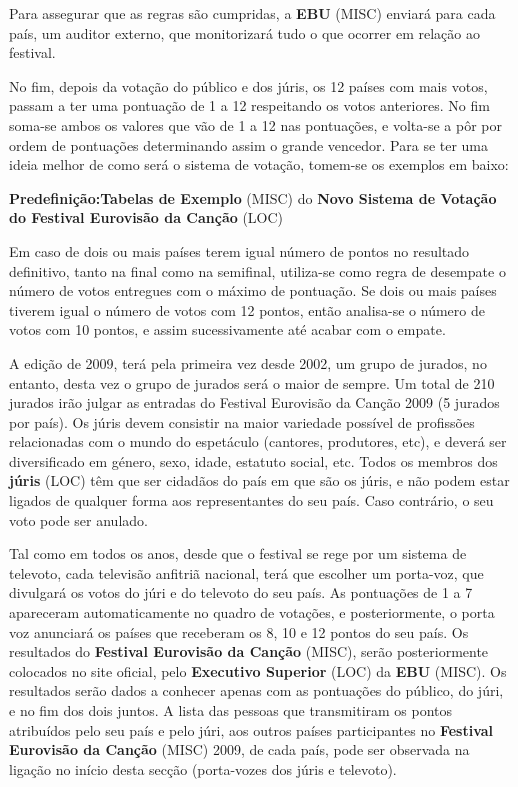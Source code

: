 \documentclass[12pt,a4paper]{article}
\begin{document}
Para assegurar que as regras são cumpridas, a \textbf{EBU} (MISC) enviará para cada país, um auditor externo, que monitorizará tudo o que ocorrer em relação ao festival.

No fim, depois da votação do público e dos júris, os 12 países com mais votos, passam a ter uma pontuação de 1 a 12 respeitando os votos anteriores. No fim soma-se ambos os valores que vão de 1 a 12 nas pontuações, e volta-se a pôr por ordem de pontuações determinando assim o grande vencedor. Para se ter uma ideia melhor de como será o sistema de votação, tomem-se os exemplos em baixo:

\textbf{Predefinição:Tabelas de Exemplo} (MISC) do \textbf{Novo Sistema de Votação do Festival Eurovisão da Canção} (LOC)

Em caso de dois ou mais países terem igual número de pontos no resultado definitivo, tanto na final como na semifinal, utiliza-se como regra de desempate o número de votos entregues com o máximo de pontuação. Se dois ou mais países tiverem igual o número de votos com 12 pontos, então analisa-se o número de votos com 10 pontos, e assim sucessivamente até acabar com o empate.

A edição de 2009, terá pela primeira vez desde 2002, um grupo de jurados, no entanto, desta vez o grupo de jurados será o maior de sempre. Um total de 210 jurados irão julgar as entradas do Festival Eurovisão da Canção 2009 (5 jurados por país). Os júris devem consistir na maior variedade possível de profissões relacionadas com o mundo do espetáculo (cantores, produtores, etc), e deverá ser diversificado em género, sexo, idade, estatuto social, etc. Todos os membros dos \textbf{júris} (LOC) têm que ser cidadãos do país em que são os júris, e não podem estar ligados de qualquer forma aos representantes do seu país. Caso contrário, o seu voto pode ser anulado.

Tal como em todos os anos, desde que o festival se rege por um sistema de televoto, cada televisão anfitriã nacional, terá que escolher um porta-voz, que divulgará os votos do júri e do televoto do seu país. As pontuações de 1 a 7 apareceram automaticamente no quadro de votações, e posteriormente, o porta voz anunciará os países que receberam os 8, 10 e 12 pontos do seu país. Os resultados do \textbf{Festival Eurovisão da Canção} (MISC), serão posteriormente colocados no site oficial, pelo \textbf{Executivo Superior} (LOC) da \textbf{EBU} (MISC). Os resultados serão dados a conhecer apenas com as pontuações do público, do júri, e no fim dos dois juntos. A lista das pessoas que transmitiram os pontos atribuídos pelo seu país e pelo júri, aos outros países participantes no \textbf{Festival Eurovisão da Canção} (MISC) 2009, de cada país, pode ser observada na ligação no início desta secção (porta-vozes dos júris e televoto).
\end{document}
